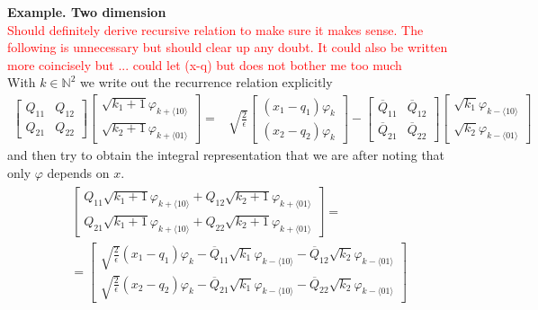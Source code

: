 \newpage
\textbf{Example. Two dimension}
\\
\textcolor{red}{Should definitely derive recursive relation to make sure it makes
sense. The following is unnecessary but should clear up any doubt. It could also be
written more coincisely but ... could let (x-q) but does not bother me too much}
\\
With $k \in \mathbb{N}^2$ we write out the recurrence relation explicitly
\begin{align}
  \begin{bmatrix}
    Q_{11} & Q_{12}
    \\
    Q_{21} & Q_{22}
  \end{bmatrix}
  \begin{bmatrix}
  \sqrt{k_{1} + 1}
  \varphi_{k + \langle 10 \rangle}
    \\
  \sqrt{k_{2} + 1}
  \varphi_{k + \langle 01 \rangle}
  \end{bmatrix}
  =&
  \sqrt{\frac{2}{\epsilon}}
  \begin{bmatrix}
    (x_1 - q_1)\varphi_k
    \\
    (x_2 - q_2)\varphi_k
  \end{bmatrix}
  -
  \begin{bmatrix}
    \overline{Q}_{11} & \overline{Q}_{12}
    \\
    \overline{Q}_{21} & \overline{Q}_{22}
  \end{bmatrix}
  \begin{bmatrix}
    \sqrt{k_1}\varphi_{k - \langle 10 \rangle}
    \\
    \sqrt{k_2}\varphi_{k - \langle 01 \rangle}
  \end{bmatrix}
\end{align}
and then try to obtain the integral representation that we
are after noting that only
$\varphi$ depends on $x$.
\begin{align}
  \begin{split}
  &\begin{bmatrix}
  Q_{11} \sqrt{k_{1} + 1} \varphi_{k + \langle 10 \rangle}
   +
   Q_{12} \sqrt{k_{2} + 1} \varphi_{k + \langle 01 \rangle}
    \\
  Q_{21} \sqrt{k_{1} + 1} \varphi_{k + \langle 10 \rangle}
   +
   Q_{22} \sqrt{k_{2} + 1} \varphi_{k + \langle 01 \rangle}
  \end{bmatrix}
  =
  \\
  &
  =\begin{bmatrix}
    \sqrt{\frac{2}{\epsilon}}(x_1 - q_1)\varphi_k
    -
    \overline{Q}_{11} \sqrt{k_{1}} \varphi_{k - \langle 10 \rangle}
     -
     \overline{Q}_{12} \sqrt{k_{2}} \varphi_{k - \langle 01 \rangle}
    \\
    \sqrt{\frac{2}{\epsilon}}(x_2 - q_2)\varphi_k
    -
    \overline{Q}_{21} \sqrt{k_{1}} \varphi_{k - \langle 10 \rangle}
     -
     \overline{Q}_{22} \sqrt{k_{2}} \varphi_{k - \langle 01 \rangle}
  \end{bmatrix}
  \end{split}
\end{align}
